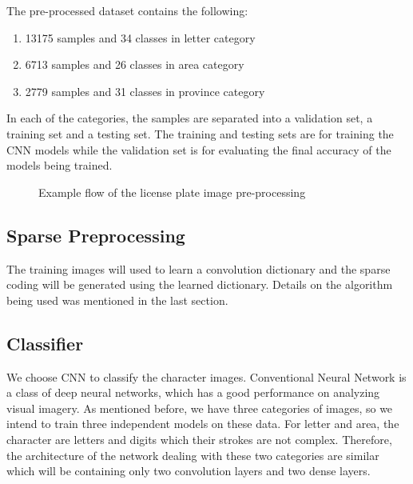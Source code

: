 The pre-processed dataset contains the following:
\begin{enumerate}
    \item 13175 samples and 34 classes in letter category
    \item 6713 samples and 26 classes in area category
    \item 2779 samples and 31 classes in province category
\end{enumerate}
In each of the categories, the samples are separated into a 
validation set, a training set and a testing set.
The training and testing sets are for training the CNN models while
the validation set is for evaluating the final accuracy of the models
being trained. 

\begin{figure}[t]
\centering
{}
\qquad
{}
\qquad
{}
\qquad
\caption{Example flow of the license plate image pre-processing}
\label{fig:preprocessing_image}
\end{figure}

\subsection{Sparse Preprocessing}
The training images will used to learn a convolution dictionary
and the sparse coding will be generated using the learned 
dictionary. Details on the algorithm being used was mentioned 
in the last section.

\subsection{Classifier}
We choose CNN to classify the character images.
Conventional Neural Network is a class of deep neural networks, 
which has a good performance on analyzing visual imagery.
As mentioned before, we have three categories of images, so we intend 
to train three independent models on these data. For letter and area, 
the character are letters and digits which their strokes are not complex.
Therefore, the architecture of the network dealing with these two categories
are similar which will be containing only two convolution layers and two dense layers.

